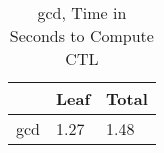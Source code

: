 \begin{table}
\centering
\caption{gcd, Time in Seconds to Compute CTL}
\label{gcd_CTL_time}
\begin{tabular}{lll}
\toprule
{} &  Leaf & Total \\
\midrule
gcd &  1.27 &  1.48 \\
\bottomrule
\end{tabular}
\end{table}
